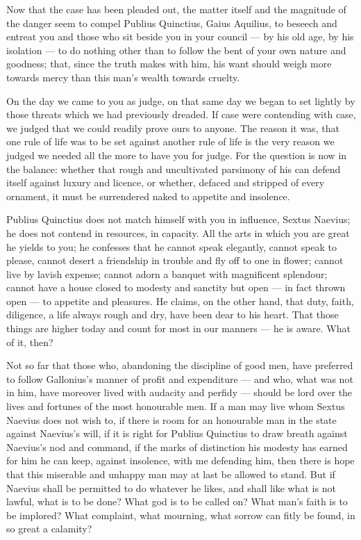  Now that the case has been pleaded out, the matter itself and the magnitude of the danger seem to compel Publius Quinctius, Gaius Aquilius, to beseech and entreat you and those who sit beside you in your council --- by his old age, by his isolation --- to do nothing other than to follow the bent of your own nature and goodness; that, since the truth makes with him, his want should weigh more towards mercy than this man's wealth towards cruelty.

 On the day we came to you as judge, on that same day we began to set lightly by those threats which we had previously dreaded. If case were contending with case, we judged that we could readily prove ours to anyone. The reason it was, that one rule of life was to be set against another rule of life is the very reason we judged we needed all the more to have you for judge. For the question is now in the balance: whether that rough and uncultivated parsimony of his can defend itself against luxury and licence, or whether, defaced and stripped of every ornament, it must be surrendered naked to appetite and insolence.

 Publius Quinctius does not match himself with you in influence, Sextus Naevius; he does not contend in resources, in capacity. All the arts in which you are great he yields to you; he confesses that he cannot speak elegantly, cannot speak to please, cannot desert a friendship in trouble and fly off to one in flower; cannot live by lavish expense; cannot adorn a banquet with magnificent splendour; cannot have a house closed to modesty and sanctity but open --- in fact thrown open --- to appetite and pleasures. He claims, on the other hand, that duty, faith, diligence, a life always rough and dry, have been dear to his heart. That those things are higher today and count for most in our manners --- he is aware. What of it, then?

 Not so far that those who, abandoning the discipline of good men, have preferred to follow Gallonius's manner of profit and expenditure --- and who, what was not in him, have moreover lived with audacity and perfidy --- should be lord over the lives and fortunes of the most honourable men. If a man may live whom Sextus Naevius does not wish to, if there is room for an honourable man in the state against Naevius's will, if it is right for Publius Quinctius to draw breath against Naevius's nod and command, if the marks of distinction his modesty has earned for him he can keep, against insolence, with me defending him, then there is hope that this miserable and unhappy man may at last be allowed to stand. But if Naevius shall be permitted to do whatever he likes, and shall like what is not lawful, what is to be done? What god is to be called on? What man's faith is to be implored? What complaint, what mourning, what sorrow can fitly be found, in so great a calamity?

